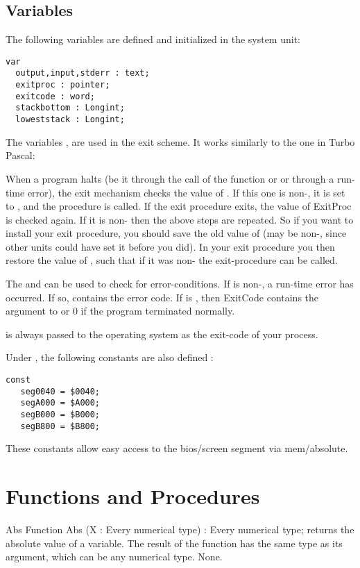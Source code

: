 \documentclass{report}
\begin{document}
\subsection{Variables}
The following variables are defined and initialized in the system unit:
\begin{verbatim}
var
  output,input,stderr : text;
  exitproc : pointer;
  exitcode : word;
  stackbottom : Longint;
  loweststack : Longint;
\end{verbatim}
The variables ,  are used in the \fpc exit
scheme. It works similarly to the one in Turbo Pascal:

When a program halts (be it through the call of the  function or
 or through a run-time error), the exit mechanism checks the value
of . If this one is non-, it is set to , and
the procedure is called. If the exit procedure exits, the value of ExitProc
is checked again. If it is non- then the above steps are repeated.
So if you want to install your exit procedure, you should save the old value
of  (may be non-, since other units could have set it before
you did). In your exit procedure you then restore the value of
, such that if it was non- the exit-procedure can be
called.

The  and  can be used to check for
error-conditions. If  is non-, a run-time error has
occurred. If so,  contains the error code. If  is
, then {ExitCode} contains the argument to  or 0 if the
program terminated normally.

 is always passed to the operating system as the exit-code of
your process.

Under , the following constants are also defined :
\begin{verbatim}
const
   seg0040 = $0040;
   segA000 = $A000;
   segB000 = $B000;
   segB800 = $B800;
\end{verbatim}
These constants allow easy access to the bios/screen segment via mem/absolute.

\section{Functions and Procedures}

\begin{function}{Abs}
\Declaration
Function Abs (X : Every numerical type) : Every numerical type;
\Description
{} returns the absolute value of a variable. The result of the
function has the same type as its argument, which can be any numerical
type.
\Errors
None.
\SeeAlso
{}
\end{function}
\end{document}
